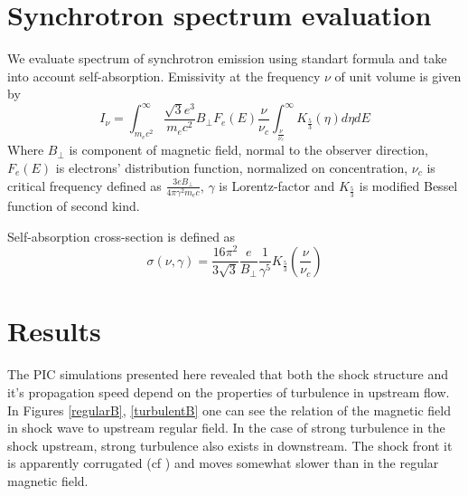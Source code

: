 \documentclass[a4paper]{jpconf}
\begin{document}
\section{Synchrotron spectrum evaluation}
We evaluate spectrum of synchrotron emission using standart formula \cite{Syrovatsky} and take into account self-absorption\cite{Ghisellini1991}. Emissivity at the frequency $\nu$ of unit volume is given by
\begin{equation}\label{emissivity}
I_{\nu}={\int_{m_e c^2}^{\infty}}\frac{\sqrt{3} e^3}{m_e c^2}B_{\perp}F_e(E)\frac{\nu}{{\nu}_c}{\int_{\frac{\nu}{{\nu}_c}}^{\infty}}K_{\frac{5}{3}}({\eta})d{\eta} dE
\end{equation}
Where $B_{\perp}$ is component of magnetic field, normal to the observer direction, $F_e(E)$ is electrons' distribution function, normalized on concentration, ${\nu}_c$ is critical frequency defined as $\frac{3 e B_{\perp}}{4 \pi {\gamma}^2 m_e c}$, $\gamma$ is Lorentz-factor and $K_{\frac{5}{3}}$ is modified Bessel function of second kind.

Self-absorption cross-section is defined as
\begin{equation}\label{selfabsorption}
{\sigma}(\nu, \gamma) = \frac{16 \pi^2}{3\sqrt{3}}\frac{e}{B_{\perp}}\frac{1}{\gamma^5}K_{\frac{5}{3}}(\frac{\nu}{{\nu}_c})
\end{equation}

\section{Results}
The PIC simulations presented here  revealed that both the shock structure  and  it's propagation speed depend on the properties of turbulence in upstream flow. In Figures \ref{regularB}, \ref{turbulentB} one can see the relation of the magnetic field in shock wave to upstream regular field. In the case of strong turbulence in the shock upstream,  
strong turbulence also exists in downstream. The shock front  it is apparently corrugated (cf \cite{2016ApJ...827...44L}) and moves somewhat slower than in 
the regular magnetic field.
\end{document}
